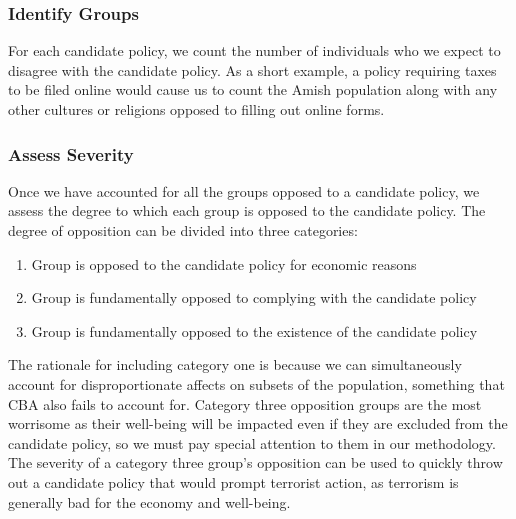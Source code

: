 \documentclass[a4paper,12pt]{article}
\begin{document}
\subsubsection{Identify Groups}
For each candidate policy, we count the number of individuals who we expect to disagree with the candidate policy.
As a short example, a policy requiring taxes to be filed online would cause us to count the Amish population along with any other cultures or religions opposed to filling out online forms.
\subsubsection{Assess Severity}
Once we have accounted for all the groups opposed to a candidate policy, we assess the degree to which each group is opposed to the candidate policy.
The degree of opposition can be divided into three categories:
\begin{enumerate}
  \item Group is opposed to the candidate policy for economic reasons
  \item Group is fundamentally opposed to complying with the candidate policy
  \item Group is fundamentally opposed to the existence of the candidate policy
\end{enumerate}
The rationale for including category one is because we can simultaneously account for disproportionate affects on subsets of the population, something that CBA also fails to account for.
Category three opposition groups are the most worrisome as their well-being will be impacted even if they are excluded from the candidate policy, so we must pay special attention to them in our methodology.
The severity of a category three group's opposition can be used to quickly throw out a candidate policy that would prompt terrorist action, as terrorism is generally bad for the economy and well-being.
\end{document}
